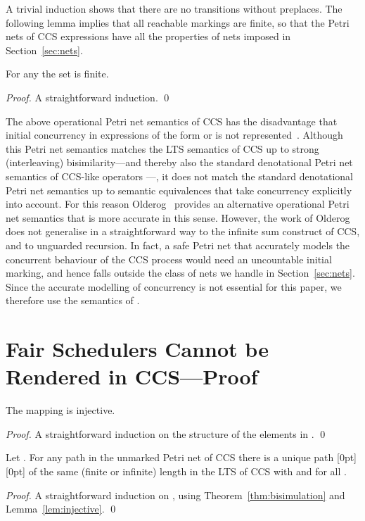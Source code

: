 \documentclass[smallcondensed]{svjour3}
\newcommand{\plat}[1]{\raisebox{0pt}[0pt][0pt]{#1}}  \def\precond#1{{\vphantom{#1}}^\bullet #1}
\newcommand{\Thm}[1]{Theorem~\ref{thm:#1}}
\newcommand{\Lem}[1]{Lemma~\ref{lem:#1}}
\newcommand{\Sect}[1]{Section~\ref{sec:#1}}
\begin{document}
A trivial induction shows that there are no transitions without preplaces.
The following lemma implies that all reachable markings are finite, so
that the Petri nets of CCS expressions
have all the properties of nets imposed in \Sect{nets}.
\begin{lemma}
For any  the set  is finite.
\end{lemma}
\begin{proof}
A straightforward induction.
\qed\end{proof}

The above operational Petri net semantics of CCS has the disadvantage that initial concurrency
in expressions of the form  or  is not represented~\cite{DDM87}.
Although this Petri net semantics matches the LTS semantics of CCS up
to strong (interleaving) bisimilarity---and thereby also the standard denotational
Petri net semantics of CCS-like operators \cite{GV87}---, it
does not match the standard denotational Petri net semantics up to semantic equivalences that take
concurrency explicitly into account. For this reason Olderog~\cite{Old91} provides an alternative
operational Petri net semantics that is more accurate in this sense. However, the work of Olderog
does not generalise in a straightforward way to the infinite sum construct of CCS, and to unguarded
recursion. 
In fact, a safe Petri net that accurately models the concurrent behaviour of the CCS process
 would need an uncountable initial marking, and hence falls outside
the class of nets we handle in \Sect{nets}. Since the accurate modelling of concurrency is not
essential for this paper, we therefore use the semantics of \cite{DDM87}.

\section[Fair Schedulers Cannot be Rendered in CCS---Proof]
        {Fair Schedulers Cannot be Rendered in CCS---Proof}
\label{sec:proof conclusion}

\begin{lemma}\label{lem:injective}
The mapping  is injective.
\end{lemma}
\begin{proof}
A straightforward induction on the structure of the elements in .
\qed
\end{proof}

\begin{lemma}\label{lem:path transfer}
Let .
For any path  in the unmarked Petri net of CCS
there is a unique path \plat{} of the same (finite or infinite) length in the LTS of CCS with  and  for
all .
\end{lemma}
\begin{proof}
A straightforward induction on , using \Thm{bisimulation} and \Lem{injective}.
\qed
\end{proof}
\end{document}
